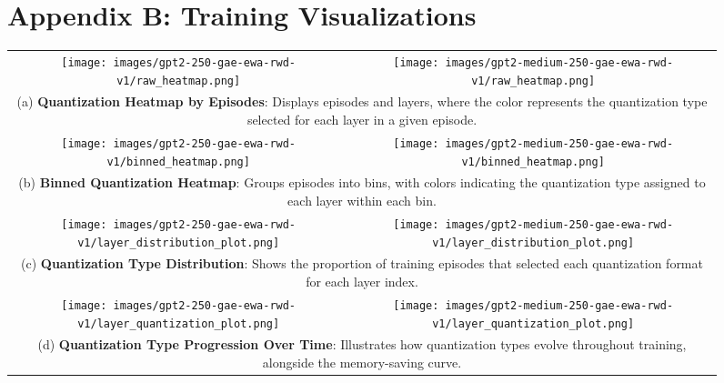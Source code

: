 \documentclass{article}
\begin{document}
	\newpage
	\begin{figure*}[ht!]
		\centering
		\begin{minipage}{\textwidth}
			\centering
			\section*{Appendix B: Training Visualizations}
			\label{sec:appendix-b}
			\vspace{10pt} %
		\end{minipage}
		
		\renewcommand{\arraystretch}{1.2}
		\begin{tabular}{cc}
        \texttt{[image: images/gpt2-250-gae-ewa-rwd-v1/raw\_heatmap.png]} &
        \texttt{[image: images/gpt2-medium-250-gae-ewa-rwd-v1/raw\_heatmap.png]} \\
        \multicolumn{2}{c}{\small \parbox{\textwidth}{(a) \textbf{Quantization Heatmap by Episodes}: Displays episodes and layers, where the color represents the quantization type selected for each layer in a given episode.}} \\
    
        \texttt{[image: images/gpt2-250-gae-ewa-rwd-v1/binned\_heatmap.png]} &
        \texttt{[image: images/gpt2-medium-250-gae-ewa-rwd-v1/binned\_heatmap.png]} \\
        \multicolumn{2}{c}{\small \parbox{\textwidth}{(b) \textbf{Binned Quantization Heatmap}: Groups episodes into bins, with colors indicating the quantization type assigned to each layer within each bin.}} \\
    
        \texttt{[image: images/gpt2-250-gae-ewa-rwd-v1/layer\_distribution\_plot.png]} &
        \texttt{[image: images/gpt2-medium-250-gae-ewa-rwd-v1/layer\_distribution\_plot.png]} \\
        \multicolumn{2}{c}{\small \parbox{\textwidth}{(c) \textbf{Quantization Type Distribution}: Shows the proportion of training episodes that selected each quantization format for each layer index.}} \\
    
        \texttt{[image: images/gpt2-250-gae-ewa-rwd-v1/layer\_quantization\_plot.png]} &
        \texttt{[image: images/gpt2-medium-250-gae-ewa-rwd-v1/layer\_quantization\_plot.png]} \\
        \multicolumn{2}{c}{\small \parbox{\textwidth}{(d) \textbf{Quantization Type Progression Over Time}: Illustrates how quantization types evolve throughout training, alongside the memory-saving curve.}} \\
    

\end{tabular}
\end{figure*}
\end{document}
